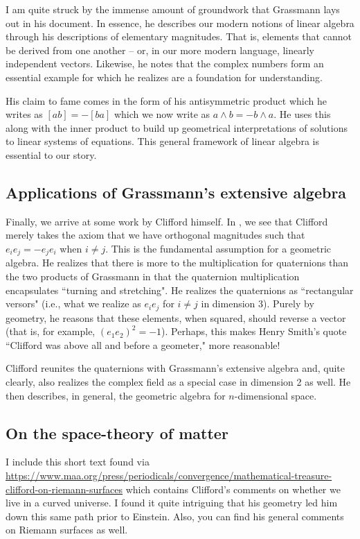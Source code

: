 \documentclass[12pt]{article}
\begin{document}
I am quite struck by the immense amount of groundwork that Grassmann lays out in his document. In essence, he describes our modern notions of linear algebra through his descriptions of elementary magnitudes. That is, elements that cannot be derived from one another -- or, in our more modern language, linearly independent vectors. Likewise, he notes that the complex numbers form an essential example for which he realizes are a foundation for understanding.

His claim to fame comes in the form of his antisymmetric product which he writes as $[ab]=-[ba]$ which we now write as $a\wedge b = - b \wedge a$. He uses this along with the inner product to build up geometrical interpretations of solutions to linear systems of equations. This general framework of linear algebra is essential to our story.

\newpage

\subsection{Applications of Grassmann's extensive algebra}

Finally, we arrive at some work by Clifford himself. In \cite{clifford_applications_1878}, we see that Clifford merely takes the axiom that we have orthogonal magnitudes such that $e_i e_j = -e_j e_i$ when $i\neq j$. This is the fundamental assumption for a geometric algebra. He realizes that there is more to the multiplication for quaternions than the two products of Grassmann in that the quaternion multiplication encapsulates ``turning and stretching". He realizes the quaternions as ``rectangular versors" (i.e., what we realize as $e_i e_j$ for $i\neq j$ in dimension 3). Purely by geometry, he reasons that these elements, when squared, should reverse a vector (that is, for example, $(e_1 e_2)^2=-1$). Perhaps, this makes Henry Smith's quote ``Clifford was above all and before a geometer," more reasonable!

Clifford reunites the quaternions with Grassmann's extensive algebra and, quite clearly, also realizes the complex field as a special case in dimension 2 as well. He then describes, in general, the geometric algebra for $n$-dimensional space.

\newpage
\subsection{On the space-theory of matter}

I include this short text found via \url{https://www.maa.org/press/periodicals/convergence/mathematical-treasure-clifford-on-riemann-surfaces} which contains Clifford's comments on whether we live in a curved universe. I found it quite intriguing that his geometry led him down this same path prior to Einstein. Also, you can find his general comments on Riemann surfaces as well.
\end{document}
